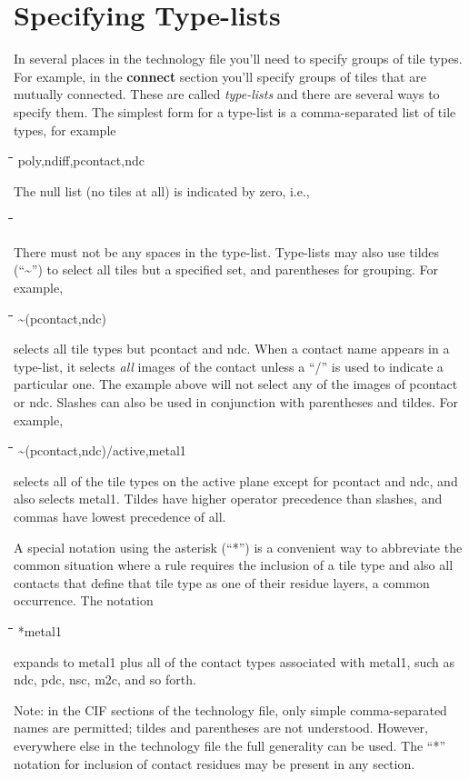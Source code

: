 \documentclass[letterpaper,twoside,12pt]{article}
\def\hinch{\hspace*{0.5in}}
\def\starti{\begin{center}\begin{tabbing}\hinch\=\hinch\=\hinch\=\hinch\=\kill}
\def\endi{\end{tabbing}\end{center}}
\def\ii{\>\>\>}
\begin{document}
\section{Specifying Type-lists} \label{typelists}

In several places in the technology file you'll need to specify
groups of tile types.  For example, in the {\bfseries connect} section
you'll specify groups of tiles that are mutually connected.  These
are called {\itshape type-lists} and there are several ways to specify
them.  The simplest form for a type-list is a comma-separated list
of tile types, for example

\starti
   \ii poly,ndiff,pcontact,ndc
\endi

The null list (no tiles at all) is indicated by zero, i.e.,

\starti
   \ii 0
\endi

There must not be any spaces in the type-list.  Type-lists may also
use tildes (``\~{}'') to select all tiles but a specified set, and
parentheses for grouping.  For example,

\starti
   \ii \~{}(pcontact,ndc)
\endi

selects all tile types but pcontact and ndc.  When a contact name appears
in a type-list, it selects {\itshape all} images of the contact unless
a ``/'' is used to indicate a particular one.  The example
above will not select any of the images of pcontact or ndc.
Slashes can also be used in conjunction with parentheses and tildes.
For example,

\starti
   \ii \~{}(pcontact,ndc)/active,metal1
\endi

selects all of the tile types on the active plane except for
pcontact and ndc, and also selects metal1.  Tildes have higher operator
precedence than slashes, and commas have lowest precedence of
all.

A special notation using the asterisk (``*'') is a convenient way
to abbreviate the common situation where a rule requires the inclusion
of a tile type and also all contacts that define that tile type as one
of their residue layers, a common occurrence.  The notation

\starti
   \ii *metal1
\endi

expands to metal1 plus all of the contact types associated with
metal1, such as ndc, pdc, nsc, m2c, and so forth.

Note: in the CIF sections of the technology file, only simple
comma-separated names are permitted; tildes and parentheses are
not understood.  However, everywhere else in the technology file
the full generality can be used.  The ``*'' notation for inclusion
of contact residues may be present in any section.
\end{document}
